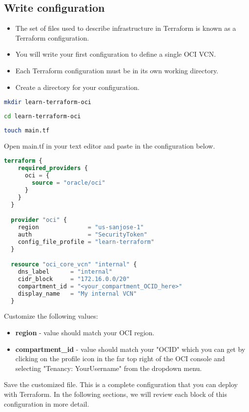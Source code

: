 \documentclass[../main.tex]{subfiles}
\begin{document}
\subsection{Write configuration}
\begin{itemize}
  \item The set of files used to describe infrastructure in Terraform is known as a Terraform configuration.
  \item You will write your first configuration to define a single \gls{OCI} \gls{VCN}.
  \item Each Terraform configuration must be in its own working directory.
  \item Create a directory for your configuration.
\end{itemize}

\begin{lstlisting}[language=bash]
  mkdir learn-terraform-oci
\end{lstlisting}

\begin{lstlisting}[language=bash]
  cd learn-terraform-oci
\end{lstlisting}

\begin{lstlisting}[language=bash]
  touch main.tf
\end{lstlisting}

Open main.tf in your text editor and paste in the configuration below.
\begin{lstlisting}[language=Terraform]
  terraform {
    required_providers {
      oci = {
        source = "oracle/oci"
      }
    }
  }

  provider "oci" {
    region              = "us-sanjose-1"
    auth                = "SecurityToken"
    config_file_profile = "learn-terraform"
  }

  resource "oci_core_vcn" "internal" {
    dns_label      = "internal"
    cidr_block     = "172.16.0.0/20"
    compartment_id = "<your_compartment_OCID_here>"
    display_name   = "My internal VCN"
  }
\end{lstlisting}

Customize the following values:
\begin{itemize}
  \item {\textbf{region} - value should match your \gls{OCI} region.}
  \item{\textbf{compartment\_id} - value should match your "\gls{OCID}" which you can get by clicking on the profile icon in the far top right of the \gls{OCI} console and selecting "Tenancy: YourUsername" from the dropdown menu.}
\end{itemize}
Save the customized file.
This is a complete configuration that you can deploy with Terraform. In the following sections, we will review each block of this configuration in more detail.
\end{document}
